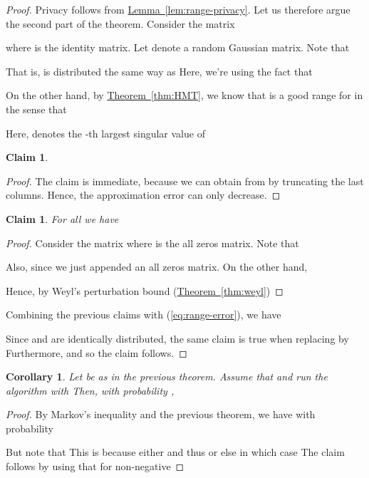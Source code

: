 \documentclass[letterpaper,11pt]{article}
\newtheorem{corollary}[theorem]{Corollary}
\newtheorem{claim}[theorem]{Claim}
\theoremstyle{definition}
\newcommand{\claimlabel}[1]{\label{claim:#1}}
\newcommand{\corollarylabel}[1]{\label{cor:#1}}
\newcommand{\lemmaref}[1]{\hyperref[lem:#1]{Lemma~\ref{lem:#1}}}
\newcommand{\theoremref}[1]{\hyperref[thm:#1]{Theorem~\ref{thm:#1}}}
\begin{document}
\begin{proof}
Privacy follows from \lemmaref{range-privacy}. Let us therefore argue the
second part of the theorem. Consider the  matrix

where  is the  identity matrix. Let  denote
a random  Gaussian matrix.
Note that

That is,  is distributed the same way as  Here, we're
using the fact that 

On the other hand, by \theoremref{HMT}, we know that  is a good range for
 in the sense that

Here,  denotes the -th largest singular value of 

\begin{claim}\claimlabel{one}

\end{claim}
\begin{proof}
The claim is immediate, because we can obtain  from  by truncating the
last  columns. Hence, the approximation error can only decrease.
\end{proof}

\begin{claim}\claimlabel{two}
For all  we have 
\end{claim}

\begin{proof}
Consider the matrix  where  is
the all zeros matrix. Note that

Also,  since we just appended an all zeros matrix.
On the other hand,

Hence, by Weyl's perturbation bound (\theoremref{weyl})

\end{proof}

Combining the previous claims with (\ref{eq:range-error}), we have

Since  and  are identically distributed, the same claim is true
when replacing  by  Furthermore, 
and so the claim follows.
\end{proof}

\begin{corollary}\corollarylabel{range-finder}
Let  be as in the previous theorem. Assume that 
and run the algorithm with  Then, with probability ,

\end{corollary}
\begin{proof}
By Markov's inequality and the previous theorem, we have with probability


But note that  This is because either  and thus
 or else  in which case
 The claim follows by using that
 for non-negative 
\end{proof}
\end{document}
